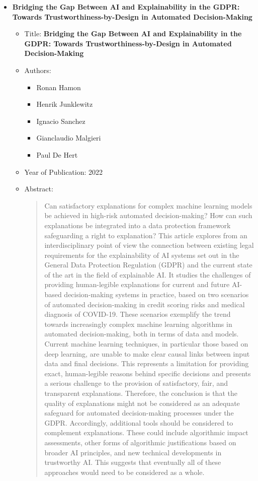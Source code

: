 \documentclass{article}
\begin{document}
\begin{itemize}
        \item \textbf{Bridging the Gap Between AI and 
        Explainability in the GDPR: Towards 
        Trustworthiness-by-Design in 
        Automated Decision-Making}
        \begin{itemize}
            \item Title: \textbf{Bridging the Gap Between AI and 
            Explainability in the GDPR: Towards 
            Trustworthiness-by-Design in 
            Automated Decision-Making}
            \item Authors:
            \begin{itemize}
                \item Ronan Hamon
                \item Henrik Junklewitz
                \item Ignacio Sanchez
                \item Gianclaudio Malgieri
                \item Paul De Hert
            \end{itemize}
            \item Year of Publication: 2022
            \item Abstract:
            \begin{abstract}
                Can satisfactory explanations for complex machine learning models be achieved in high-risk automated decision-making? How can such explanations be integrated into a data protection framework safeguarding a right to explanation? This article explores from an interdisciplinary point of view the connection between existing legal requirements for the explainability of AI systems set out in the General Data Protection Regulation (GDPR) and the current state of the art in the field of explainable AI. It studies the challenges of providing human-legible explanations for current and future AI-based decision-making systems in practice, based on two scenarios of automated decision-making in credit scoring risks and medical diagnosis of COVID-19. These scenarios exemplify the trend towards increasingly complex machine learning algorithms in automated decision-making, both in terms of data and models. Current machine learning techniques, in particular those based on deep learning, are unable to make clear causal links between input data and final decisions. This represents a limitation for providing exact, human-legible reasons behind specific decisions and presents a serious challenge to the provision of satisfactory, fair, and transparent explanations. Therefore, the conclusion is that the quality of explanations might not be considered as an adequate safeguard for automated decision-making processes under the GDPR. Accordingly, additional tools should be considered to complement explanations. These could include algorithmic impact assessments, other forms of algorithmic justifications based on broader AI principles, and new technical developments in trustworthy AI. This suggests that eventually all of these approaches would need to be considered as a whole.
            \end{abstract}
        \end{itemize}
        

\end{itemize}
\end{document}
